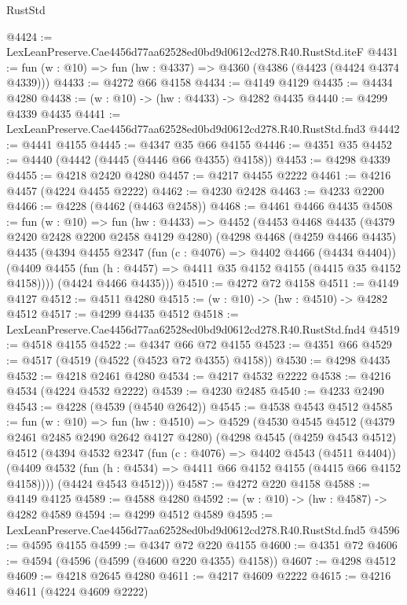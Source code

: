 \begin{lexlean}{RustStd}
\begin{coremodule}
@4424 := LexLeanPreserve.Cae4456d77aa62528ed0bd9d0612cd278.R40.RustStd.iteF
@4431 := fun (w : @10) => fun (hw : @4337) => @4360 (@4386 (@4423 (@4424 @4374 @4339)))
@4433 := @4272 @66 @4158
@4434 := @4149 @4129
@4435 := @4434 @4280
@4438 := (w : @10) -> (hw : @4433) -> @4282 @4435
@4440 := @4299 @4339 @4435
@4441 := LexLeanPreserve.Cae4456d77aa62528ed0bd9d0612cd278.R40.RustStd.fnd3
@4442 := @4441 @4155
@4445 := @4347 @35 @66 @4155
@4446 := @4351 @35
@4452 := @4440 (@4442 (@4445 (@4446 @66 @4355) @4158))
@4453 := @4298 @4339
@4455 := @4218 @2420 @4280
@4457 := @4217 @4455 @2222
@4461 := @4216 @4457 (@4224 @4455 @2222)
@4462 := @4230 @2428
@4463 := @4233 @2200
@4466 := @4228 (@4462 (@4463 @2458))
@4468 := @4461 @4466 @4435
@4508 := fun (w : @10) =>
  fun (hw : @4433) =>
  @4452
    (@4453
      @4468
      @4435
      (@4379 @2420 @2428 @2200 @2458 @4129 @4280)
      (@4298
        @4468
        (@4259 @4466 @4435)
        @4435
        (@4394
          @4455
          @2347
          (fun (c : @4076) => @4402 @4466 (@4434 @4404))
          (@4409 @4455 (fun (h : @4457) => @4411 @35 @4152 @4155 (@4415 @35 @4152 @4158))))
        (@4424 @4466 @4435)))
@4510 := @4272 @72 @4158
@4511 := @4149 @4127
@4512 := @4511 @4280
@4515 := (w : @10) -> (hw : @4510) -> @4282 @4512
@4517 := @4299 @4435 @4512
@4518 := LexLeanPreserve.Cae4456d77aa62528ed0bd9d0612cd278.R40.RustStd.fnd4
@4519 := @4518 @4155
@4522 := @4347 @66 @72 @4155
@4523 := @4351 @66
@4529 := @4517 (@4519 (@4522 (@4523 @72 @4355) @4158))
@4530 := @4298 @4435
@4532 := @4218 @2461 @4280
@4534 := @4217 @4532 @2222
@4538 := @4216 @4534 (@4224 @4532 @2222)
@4539 := @4230 @2485
@4540 := @4233 @2490
@4543 := @4228 (@4539 (@4540 @2642))
@4545 := @4538 @4543 @4512
@4585 := fun (w : @10) =>
  fun (hw : @4510) =>
  @4529
    (@4530
      @4545
      @4512
      (@4379 @2461 @2485 @2490 @2642 @4127 @4280)
      (@4298
        @4545
        (@4259 @4543 @4512)
        @4512
        (@4394
          @4532
          @2347
          (fun (c : @4076) => @4402 @4543 (@4511 @4404))
          (@4409 @4532 (fun (h : @4534) => @4411 @66 @4152 @4155 (@4415 @66 @4152 @4158))))
        (@4424 @4543 @4512)))
@4587 := @4272 @220 @4158
@4588 := @4149 @4125
@4589 := @4588 @4280
@4592 := (w : @10) -> (hw : @4587) -> @4282 @4589
@4594 := @4299 @4512 @4589
@4595 := LexLeanPreserve.Cae4456d77aa62528ed0bd9d0612cd278.R40.RustStd.fnd5
@4596 := @4595 @4155
@4599 := @4347 @72 @220 @4155
@4600 := @4351 @72
@4606 := @4594 (@4596 (@4599 (@4600 @220 @4355) @4158))
@4607 := @4298 @4512
@4609 := @4218 @2645 @4280
@4611 := @4217 @4609 @2222
@4615 := @4216 @4611 (@4224 @4609 @2222)

\end{coremodule}
\end{lexlean}
